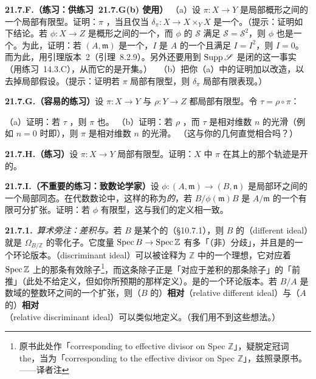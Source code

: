 \textbf{21.7.F.（练习：供\mbox{练习~21.7.G(b)} 使用）}\quad
（a）设 $\pi\colon X\to Y$ 是局部\trNoetherian{}概形之间的一个局部有限型\trMorphism。证明：$\pi$ \trUnramified，当且仅当 $\delta_\pi\colon X\to X\times_Y X$ 是一个\trOpenEmbedding。（提示：证明如下结论。若 $\phi\colon X\to Z$ 是\trNoetherian{}概形之间的一个\trClosedEmbedding，而 $\phi$ 的\trIdealSheaf{} $\mathscr{S}$ 满足 $\mathscr{S}=\mathscr{S}^2$，则 $\phi$ 也是一个\trOpenEmbedding。为此，证明：若 $(A,\mathfrak{m})$ 是一个\trNoetherian\trLocalRing，$I$ 是 $A$ 的一个\trProperIdeal{}且满足 $I=I^2$，则 $I=0$。而为此，用\trNakayama{}引理版本~2（\mbox{引理~8.2.9}）。另外还要用到 $\operatorname{Supp}\mathscr{S}$ 是闭的这一事实（用\mbox{练习~14.3.C}），从而它的\trComplement{}是开集。）
\hard\ （b）把你（a）中的证明加以改造，以去掉局部\trNoetherian{}假设。（提示：证明若 $\pi$ 局部有限型，则 $\delta_\pi$ 局部有限表现。）

\textbf{21.7.G.（容易的练习）}\quad 设 $\pi\colon X\to Y$ 与 $\rho\colon Y\to Z$ 都局部有限型。令 $\tau=\rho\circ\pi$：
（a）证明：若 $\tau$ \trUnramified，则 $\pi$ 也\trUnramified。
（b）证明：若 $\rho$ \trUnramified，而 $\tau$ 是相对维数 $n$ 的光滑\trMorphism（例如 $n=0$ 时即\trEtale），则 $\pi$ 是相对维数 $n$ 的光滑\trMorphism。
（这与你的几何直觉相合吗？）

\textbf{21.7.H.（练习）}\quad 设 $\pi\colon X\to Y$ 局部有限型。证明：$X$ 中 $\pi$ 在其上\trUnramified{}的那个轨迹是开的。

\textbf{21.7.I.（不重要的练习：致数论学家）}\quad 设 $\phi\colon(A,\mathfrak{m})\to(B,\mathfrak{n})$ 是局部环之间的一个局部同态。在代数数论中，这样的\trRingMorphism{}称为\emph{\trUnramified{}的}，若 $B/\phi(\mathfrak{m})B$ 是 $A/\mathfrak{m}$ 的一个有限可分扩张。证明：若 $\phi$ 有限型，这与我们的定义相一致。

\textbf{21.7.1.}\ \emph{算术旁注：差积与\trDiscriminant。}\quad 若 $B$ 是某个\trNumberField{}的\trRingOfIntegers{}（\S10.7.1），则 $B$ 的\textbf{\trDifferentIdeal}（different ideal）就是 $\Omega_{B/\mathbb{Z}}$ 的零化子。它度量 $\operatorname{Spec} B\to\operatorname{Spec}\mathbb{Z}$ 有多「（非）分歧」，并且是\trRamificationLocus{}的一个环论版本。\textbf{\trDiscriminantIdeal}（discriminant ideal）可以被诠释为 $\mathbb{Z}$ 中的一个理想，它对应着 $\operatorname{Spec}\mathbb{Z}$ 上的那条有效除子\footnote{原书此处作「corresponding to effective divisor on Spec $\mathbb{Z}$」，疑脱定冠词 the，当为「corresponding to the effective divisor on Spec $\mathbb{Z}$」，兹照录原书。——译者注}，而这条除子正是「对应于差积的那条除子」的「前推」（此处不给定义，但如你所预期的那样定义）。\trDiscriminantIdeal{}是\trBranchLocus{}的一个环论版本。若 $B/A$ 是数域的整数环之间的一个扩张，则（$B$ 的）\textbf{相对\trDifferentIdeal}（relative different ideal）与（$A$ 的）\textbf{相对\trDiscriminantIdeal}（relative discriminant ideal）可以类似地定义。（我们用不到这些想法。）
